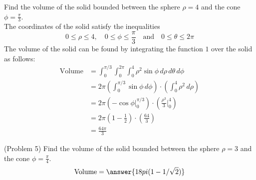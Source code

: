 \documentclass[handout]{ximera}
\begin{document}
\begin{example}[Example 5]
Find the volume of the solid bounded between the sphere $\rho = 4$ and the cone $\phi = \frac{\pi}{3}$.\\
The coordinates of the solid satisfy the inequalities
\[
0 \leq \rho \leq 4, \quad 0 \leq \phi \leq \frac{\pi}{3} \quad \text{and} \quad 0\leq \theta \leq 2\pi
\]
The volume of the solid can be found by integrating the function $1$ over the solid as follows:
\begin{align*}
\text{Volume} &= \int_0^{\pi/3} \int_0^{2\pi}  \int_0^4 \rho^2 \sin \phi \, d\rho\, d\theta\, d\phi\\
              &= 2\pi \left(\int_0^{\pi/3} \sin \phi \, d\phi\right) \cdot \left( \int_0^4 \rho^2 \, d\rho\right) \\
              &= 2\pi \left( -\cos \phi \bigg|_0^{\pi/3} \right) \cdot \left( \frac{\rho^3}{3}\bigg|_0^4\right)\\
              &= 2\pi \left(1 - \frac12\right) \cdot \left( \frac{64}{3}\right)\\
              &= \frac{64\pi}{3}
\end{align*}

\begin{image}
\end{image}

\end{example}

\begin{problem}(Problem 5)
Find the volume of the solid bounded between the sphere $\rho = 3$ and the cone $\phi = \frac{\pi}{4}$.\\
\[
\text{Volume}= \answer{18pi(1 - 1/\sqrt 2)}
\]
\end{problem}  
                      
\end{document}
